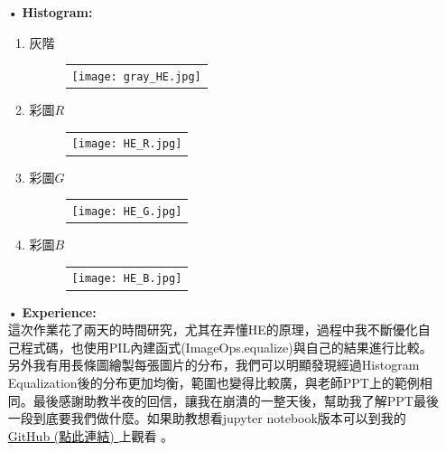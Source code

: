 \documentclass[12pt,a4paper]{article}
\begin{document}
\begin{enumerate}
\item[•]
{\bf Histogram:}
\begin{enumerate}

\item 灰階
\begin{figure}[h]
\hspace*{9em}
\begin{tabular}{c}
\texttt{[image: gray\_HE.jpg]}
\end{tabular}
\end{figure}

\newpage
\item 彩圖$R$
\begin{figure}[h]
\hspace*{9em}
\begin{tabular}{c}
\texttt{[image: HE\_R.jpg]}
\end{tabular}
\end{figure}

\item 彩圖$G$
\begin{figure}[h]
\hspace*{9em}
\begin{tabular}{c}
\texttt{[image: HE\_G.jpg]}
\end{tabular}
\end{figure}

\item 彩圖$B$
\begin{figure}[h]
\hspace*{9em}
\begin{tabular}{c}
\texttt{[image: HE\_B.jpg]}
\end{tabular}
\end{figure}
\end{enumerate}

\newpage
\item[•]
{\bf Experience:}\\
這次作業花了兩天的時間研究，尤其在弄懂HE的原理，過程中我不斷優化自己程式碼，也使用PIL內建函式(ImageOps.equalize)與自己的結果進行比較。另外我有用長條圖繪製每張圖片的分布，我們可以明顯發現經過Histogram Equalization後的分布更加均衡，範圍也變得比較廣，與老師PPT上的範例相同。最後感謝助教半夜的回信，讓我在崩潰的一整天後，幫助我了解PPT最後一段到底要我們做什麼。如果助教想看jupyter notebook版本可以到我的
\href{https://nbviewer.jupyter.org/github/Jia-wei-liao/Mywork/blob/master/%E5%BD%B1%E5%83%8F%E8%99%95%E7%90%86/HW4/%E5%BB%96%E5%AE%B6%E7%B7%AF.HW4.ipynb}{GitHub (點此連結) }上觀看 。
\end{enumerate}
\end{document}

